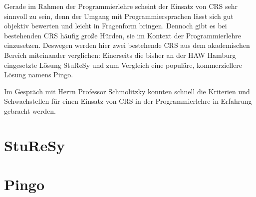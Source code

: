 Gerade im Rahmen der Programmierlehre scheint der Einsatz von CRS sehr sinnvoll zu sein, denn der Umgang mit Programmiersprachen lässt sich gut objektiv bewerten und leicht in Fragenform bringen. Dennoch gibt es bei bestehenden CRS häufig große Hürden, sie im Kontext der Programmierlehre einzusetzen. Deswegen werden hier zwei bestehende CRS aus dem akademischen Bereich miteinander verglichen: Einerseits die bisher an der HAW Hamburg eingesetzte Lösung StuReSy und zum Vergleich eine populäre, kommerziellere Lösung namens Pingo.

Im Gespräch mit Herrn Professor Schmolitzky konnten schnell die Kriterien und Schwachstellen für einen Einsatz von CRS in der Programmierlehre in Erfahrung gebracht werden.

\section{StuReSy}
\label{chap:sturesy}


\newpage
\section{Pingo}
\label{chap:pingo}
